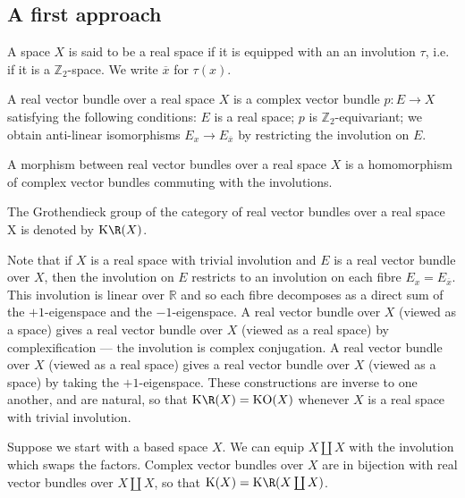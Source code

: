 \documentclass[11pt]{article}
\begin{document}
\begin{FirstNineLectures}
\subsection*{A first approach}
\begin{defn*} A space $X$ is said to be a real space if it is equipped with an an involution $\tau$, i.e. if it is a $\mathbb{Z}_2$-space. We write $\overline{x}$ for $\tau(x)$.
\end{defn*}
\begin{defn*} A real vector bundle over a real space $X$ is a complex vector bundle $p:E\to X$ satisfying the following conditions: $E$ is a real space; $p$ is $\mathbb{Z}_2$-equivariant; we obtain anti-linear isomorphisms $E_x \to E_{\overline{x}}$ by restricting the involution on $E$.
\end{defn*}
\begin{defn*} 
A morphism between real vector bundles over a real space $X$ is a homomorphism of complex vector bundles commuting with the involutions.
\end{defn*}
\begin{defn*}
The Grothendieck group of the category of real vector bundles over a real space X is denoted by $\KR(X)$.
\end{defn*}
Note that if $X$ is a real space with trivial involution and $E$ is a real vector bundle over $X$, then the involution on $E$ restricts to an involution on each fibre $E_{x}=E_{\overline{x}}$. This involution is linear over $\mathbb{R}$ and so each fibre decomposes as a direct sum of the $+1$-eigenspace and the $-1$-eigenspace. A real vector bundle over $X$ (viewed as a space) gives a real vector bundle over $X$ (viewed as a real space) by complexification --- the involution is complex conjugation. A real vector bundle over $X$ (viewed as a real space) gives a real vector bundle over $X$ (viewed as a space) by taking the $+1$-eigenspace. These constructions are inverse to one another, and are natural, so that $\KR(X)=\KO(X)$ whenever $X$ is a real space with trivial involution.

Suppose we start with a based space $X$. We can equip $X\coprod X$  with the involution which swaps the factors. Complex vector bundles over $X$ are in bijection with real vector bundles over $X\coprod X$, so that $\K(X)=\KR(X\coprod X)$.

\end{FirstNineLectures}
\end{document}
